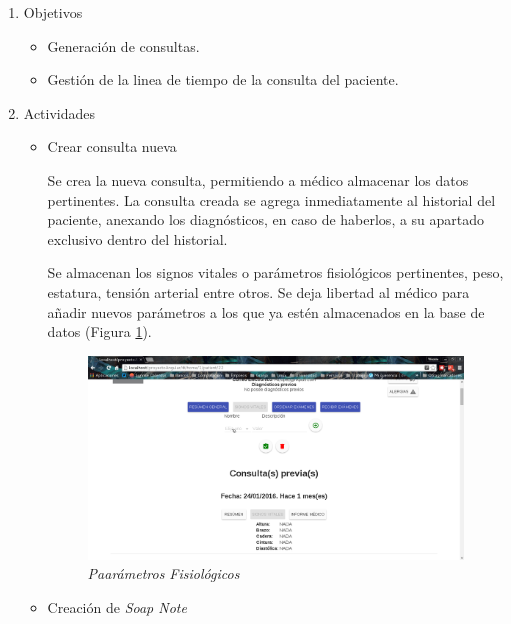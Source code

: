     \begin{enumerate}
        \item Objetivos
        \begin{itemize}
            \item Generación de consultas.
            \item Gestión de la linea de tiempo de la consulta del paciente.
        \end{itemize}
        \item Actividades
        \begin{itemize}
            \item Crear consulta nueva
            
            Se crea la nueva consulta, permitiendo a médico almacenar los datos pertinentes. La consulta creada se agrega inmediatamente al historial del paciente, anexando los diagnósticos, en caso de haberlos, a su apartado exclusivo dentro del historial.
            
            
            
            Se almacenan los signos vitales o parámetros fisiológicos pertinentes, peso, estatura, tensión arterial entre otros. Se deja libertad al médico para añadir nuevos parámetros a los que ya estén almacenados en la base de datos (Figura \ref{parametros}).
            
            \begin{figure}[htbp!]
                \begin{center}
                    \includegraphics[width=.8\textwidth]{figures/p13}
                \end{center}
                \caption{\textit{Paarámetros Fisiológicos}}
                \label{parametros}
            \end{figure}
            
            \item Creación de \textit{Soap Note}
            

\end{itemize}
\end{enumerate}
